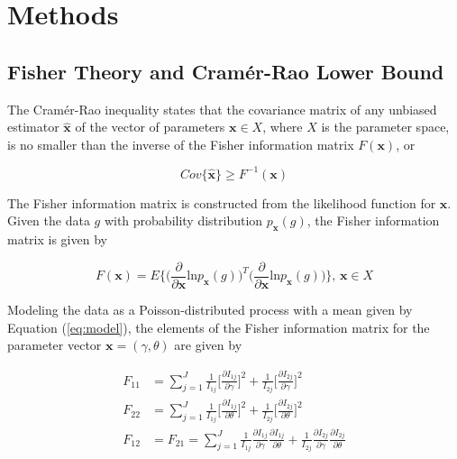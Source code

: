 \documentclass[aps, secnumarabic, amssymb, notitlepage]{article}
\begin{document}
\section{Methods}

\subsection{Fisher Theory and Cram\'er-Rao Lower Bound}
The Cram\'er-Rao inequality states \cite{fisher} that the covariance matrix of any unbiased estimator $\hat{\bm{x}}$ of the vector of parameters $\bm{x} \in X$, where $X$ is the parameter space, is no smaller than the inverse of the Fisher information matrix $F(\bm{x})$, or

\begin{equation}
  Cov\{\hat{\bm{x}}\} \ge F^{-1}(\bm{x})
  \label{eq:inequality}
\end{equation}

The Fisher information matrix is constructed from the likelihood function for $\bm{x}$. Given the data $g$ with probability distribution $p_{\bm{x}}(g)$, the Fisher information matrix is given by

\begin{equation}
  F(\bm{x}) = E \bigg\{ \bigg( \frac{\partial}{\partial\bm{x}} \text{ln} p_{\bm{x}}(g)\bigg)^T \bigg( \frac{\partial}{\partial\bm{x}} \text{ln} p_{\bm{x}}(g)\bigg) \bigg\} \text{,   }  \bm{x} \in X
\end{equation}

Modeling the data as a Poisson-distributed process with a mean given by Equation (\ref{eq:model}), the elements of the Fisher information matrix for the parameter vector $\bm{x} = (\gamma, \theta)$ are given by

\begin{align}
\nonumber  F_{11} &= \sum_{j=1}^{J} \frac{1}{I_{1j}}\bigg[ \frac{\partial I_{1j}}{\partial\gamma}\bigg]^2 + \frac{1}{I_{2j}}\bigg[ \frac{\partial I_{2j}}{\partial\gamma}\bigg]^2\\[6pt]
  F_{22} &= \sum_{j=1}^{J} \frac{1}{I_{1j}}\bigg[ \frac{\partial I_{1j}}{\partial\theta}\bigg]^2 + \frac{1}{I_{2j}}\bigg[ \frac{\partial I_{2j}}{\partial\theta}\bigg]^2\\[6pt]
\nonumber  F_{12} &= F_{21} = \sum_{j=1}^{J} \frac{1}{I_{1j}} \frac{\partial I_{1j}}{\partial\gamma} \frac{\partial I_{1j}}{\partial\theta} + \frac{1}{I_{2j}} \frac{\partial I_{2j}}{\partial\gamma} \frac{\partial I_{2j}}{\partial\theta}
\end{align}
\end{document}
